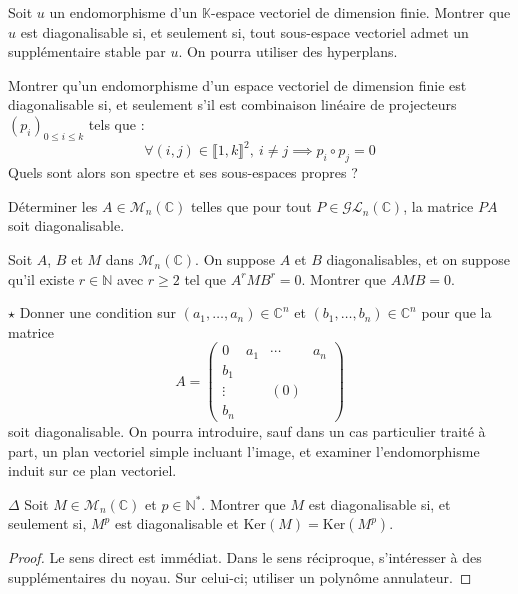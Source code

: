 \documentclass[french,a4paper]{article}
\newcommand{\N}{\mathbb{N}}
\newcommand{\C}{\mathbb{C}}
\newcommand{\K}{\mathbb{K}}
\newcommand{\st}{^*}
\renewcommand{\ker}{\text{Ker}}
\theoremstyle{plain}
\theoremstyle{definition}
\theoremstyle{remark}
\begin{document}
\begin{ex}{}
	Soit $u$ un endomorphisme d'un $\K$-espace vectoriel de dimension finie. Montrer que $u$ est diagonalisable si, et seulement si, tout sous-espace vectoriel admet un supplémentaire stable par $u$. On pourra utiliser des hyperplans.
\end{ex}

\begin{ex}{}
	Montrer qu'un endomorphisme d'un espace vectoriel de dimension finie est diagonalisable si, et seulement s'il est combinaison linéaire de projecteurs $(p_i)_{0\leqslant i\leqslant k}$ tels que : $$\forall (i,j)\in\llbracket1,k\rrbracket^2,\ i\ne j\implies p_i\circ p_j=0$$ Quels sont alors son spectre et ses sous-espaces propres ?
\end{ex}

\begin{ex}{}
	Déterminer les $A\in\mathcal{M}_n(\C)$ telles que pour tout $P\in\mathcal{GL}_n(\C)$, la matrice $PA$ soit diagonalisable.
\end{ex}

\begin{ex}{}
	Soit $A$, $B$ et $M$ dans $\mathcal{M}_n(\C)$. On suppose $A$ et $B$ diagonalisables, et on suppose qu'il existe $r\in\N$ avec $r\geqslant 2$ tel que $A^rMB^r=0$. Montrer que $AMB=0$.
\end{ex}

\begin{ex}{$\star$}
	Donner une condition sur $(a_1,\ldots,a_n)\in\C^n$ et $(b_1,\ldots,b_n)\in\C^n$ pour que la matrice $$A=\begin{pmatrix}
		0&a_1&\cdots&a_n\\
		b_1&&&\\
		\vdots&&(0)&\\
		b_n&&&
	\end{pmatrix}$$ soit diagonalisable. On pourra introduire, sauf dans un cas particulier traité à part, un plan vectoriel simple incluant l'image, et examiner l'endomorphisme induit sur ce plan vectoriel.
\end{ex}

\begin{ex}{$\Delta$}
	Soit $M\in\mathcal{M}_n(\C)$ et $p\in\N\st$. Montrer que $M$ est diagonalisable si, et seulement si, $M^p$ est diagonalisable et $\ker(M)=\ker(M^p)$.
\end{ex}
\begin{proof}
	Le sens direct est immédiat. Dans le sens réciproque, s'intéresser à des supplémentaires du noyau. Sur celui-ci; utiliser un polynôme annulateur.
\end{proof}
\end{document}
